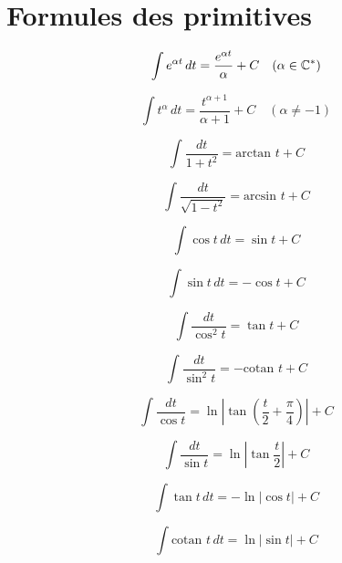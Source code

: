 \documentclass[10pt,class=article,crop=false]{standalone}
\begin{document}
\section{Formules des primitives}

{\large
	

$$\int e^{\alpha t} \, dt= \frac{e^{\alpha t}}{\alpha}+C \quad (\alpha \in \mathbb{C}^*)$$

\begin{multicols}{2}[
	]
	
	$$\int t^{\alpha} \, dt= \frac{t^{\alpha +1}}{\alpha+1}+C \quad (\alpha \not= -1)$$
	
	\vspace{2mm}
	
	$$\int \frac{dt}{1+t^2} = \text{arctan }t+C$$
	
	\vspace{6mm}
	
	$$\int \frac{dt}{\sqrt{1-t^2}} = \text{arcsin }t+C$$
	
	\vspace{4mm}
	
	
	$$\int \cos t \, dt = \sin t +C$$
	
	$$\int \sin t \, dt = -\cos t +C$$
	
	$$\int \frac{dt}{\cos^2 t} = \tan t +C$$
	
	$$\int \frac{dt}{\sin^2 t} = -\text{cotan } t +C$$
	
	$$\int \frac{dt}{\cos t} = \ln \left| \tan \left( \frac{t}{2}+\frac{\pi}{4} \right) \right| +C$$
	
	$$\int \frac{dt}{\sin t} = \ln \left| \tan \frac{t}{2} \right| +C$$
	
	$$\int \tan t \, dt = - \ln \left| \cos t \right| +C$$
	
	\vspace{-2mm}
	
	$$\int \text{cotan } t \, dt = \ln \left| \sin t \right| +C$$
	

\end{multicols}}
\end{document}
